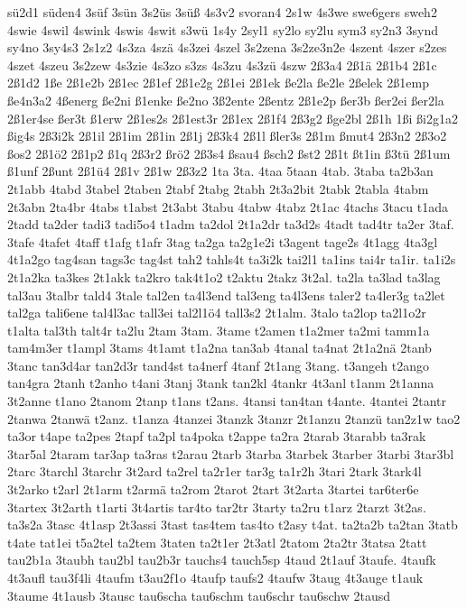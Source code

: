 {sü2d1
süden4
3süf
3sün
3s2üs
3süß
4s3v2
svoran4
2s1w
4s3we
swe6gers
sweh2
4swie
4swil
4swink
4swis
4swit
s3wü
1s4y
2syl1
sy2lo
sy2lu
sym3
sy2n3
3synd
sy4no
3sy4s3
2s1z2
4s3za
4szä
4s3zei
4szel
3s2zena
3s2ze3n2e
4szent
4szer
s2zes
4szet
4szeu
3s2zew
4s3zie
4s3zo
s3zs
4s3zu
4s3zü
4szw
2ß3a4
2ß1ä
2ß1b4
2ß1c
2ß1d2
1ße
2ß1e2b
2ß1ec
2ß1ef
2ß1e2g
2ß1ei
2ß1ek
ße2la
ße2le
2ßelek
2ß1emp
ße4n3a2
4ßenerg
ße2ni
ß1enke
ße2no
3ß2ente
2ßentz
2ß1e2p
ßer3b
ßer2ei
ßer2la
2ß1er4se
ßer3t
ß1erw
2ß1es2s
2ß1est3r
2ß1ex
2ß1f4
2ß3g2
ßge2bl
2ß1h
1ßi
ßi2g1a2
ßig4s
2ß3i2k
2ß1il
2ß1im
2ß1in
2ß1j
2ß3k4
2ß1l
ßler3s
2ß1m
ßmut4
2ß3n2
2ß3o2
ßos2
2ß1ö2
2ß1p2
ß1q
2ß3r2
ßrö2
2ß3s4
ßsau4
ßsch2
ßst2
2ß1t
ßt1in
ß3tü
2ß1um
ß1unf
2ßunt
2ß1ü4
2ß1v
2ß1w
2ß3z2
1ta
3ta.
4taa
5taan
4tab.
3taba
ta2b3an
2t1abb
4tabd
3tabel
2taben
2tabf
2tabg
2tabh
2t3a2bit
2tabk
2tabla
4tabm
2t3abn
2ta4br
4tabs
t1abst
2t3abt
3tabu
4tabw
4tabz
2t1ac
4tachs
3tacu
t1ada
2tadd
ta2der
tadi3
tadi5o4
t1adm
ta2dol
2t1a2dr
ta3d2s
4tadt
tad4tr
ta2er
3taf.
3tafe
4tafet
4taff
t1afg
t1afr
3tag
ta2ga
ta2g1e2i
t3agent
tage2s
4t1agg
4ta3gl
4t1a2go
tag4san
tags3c
tag4st
tah2
tahls4t
ta3i2k
tai2l1
ta1ins
tai4r
ta1ir.
ta1i2s
2t1a2ka
ta3kes
2t1akk
ta2kro
tak4t1o2
t2aktu
2takz
3t2al.
ta2la
ta3lad
ta3lag
tal3au
3talbr
tald4
3tale
tal2en
ta4l3end
tal3eng
ta4l3ens
taler2
ta4ler3g
ta2let
tal2ga
tali6ene
tal4l3ac
tall3ei
tal2l1ö4
tall3s2
2t1alm.
3talo
ta2lop
ta2l1o2r
t1alta
tal3th
talt4r
ta2lu
2tam
3tam.
3tame
t2amen
t1a2mer
ta2mi
tamm1a
tam4m3er
t1ampl
3tams
4t1amt
t1a2na
tan3ab
4tanal
ta4nat
2t1a2nä
2tanb
3tanc
tan3d4ar
tan2d3r
tand4st
ta4nerf
4tanf
2t1ang
3tang.
t3angeh
t2ango
tan4gra
2tanh
t2anho
t4ani
3tanj
3tank
tan2kl
4tankr
4t3anl
t1anm
2t1anna
3t2anne
t1ano
2tanom
2tanp
t1ans
t2ans.
4tansi
tan4tan
t4ante.
4tantei
2tantr
2tanwa
2tanwä
t2anz.
t1anza
4tanzei
3tanzk
3tanzr
2t1anzu
2tanzü
tan2z1w
tao2
ta3or
t4ape
ta2pes
2tapf
ta2pl
ta4poka
t2appe
ta2ra
2tarab
3tarabb
ta3rak
3tar5al
2taram
tar3ap
ta3ras
t2arau
2tarb
3tarba
3tarbek
3tarber
3tarbi
3tar3bl
2tarc
3tarchl
3tarchr
3t2ard
ta2rel
ta2r1er
tar3g
ta1r2h
3tari
2tark
3tark4l
3t2arko
t2arl
2t1arm
t2armä
ta2rom
2tarot
2tart
3t2arta
3tartei
tar6ter6e
3tartex
3t2arth
t1arti
3t4artis
tar4to
tar2tr
3tarty
ta2ru
t1arz
2tarzt
3t2as.
ta3s2a
3tasc
4t1asp
2t3assi
3tast
tas4tem
tas4to
t2asy
t4at.
ta2ta2b
ta2tan
3tatb
t4ate
tat1ei
t5a2tel
ta2tem
3taten
ta2t1er
2t3atl
2tatom
2ta2tr
3tatsa
2tatt
tau2b1a
3taubh
tau2bl
tau2b3r
tauchs4
tauch5sp
4taud
2t1auf
3taufe.
4taufk
4t3aufl
tau3f4li
4taufm
t3au2f1o
4taufp
taufs2
4taufw
3taug
4t3auge
t1auk
3taume
4t1ausb
3tausc
tau6scha
tau6schm
tau6schr
tau6schw
2tausd
}

